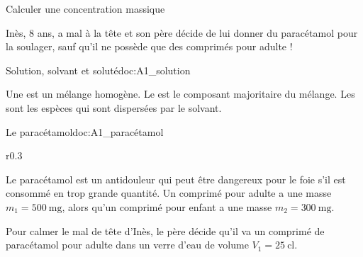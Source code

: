 \teteSndSolu

\vspace*{-36pt}

\begin{objectifs}
  \item Calculer une concentration massique
\end{objectifs}


\begin{contexte}
  Inès, 8 ans, a mal à la tête et son père décide de lui donner du paracétamol pour la soulager, sauf qu'il ne possède que des comprimés pour adulte !

\end{contexte}


\begin{doc}{Solution, solvant et soluté}{doc:A1_solution}
  \begin{importants}
    Une  est un mélange homogène.
    Le  est le composant majoritaire du mélange.
    Les  sont les espèces qui sont dispersées par le solvant.
    \begin{center}
    \end{center}
  \end{importants}
\end{doc}

\begin{doc}{Le paracétamol}{doc:A1_paracétamol}
  \begin{wrapfigure}[5]{r}{0.3\linewidth}
    \vspace*{-30pt}
    \centering
  \end{wrapfigure}
  
  Le paracétamol est un antidouleur qui peut être dangereux pour le foie s'il est consommé en trop grande quantité.
  Un comprimé pour adulte a une masse $m_1 = \qty{500}{\milli\g}$, alors qu'un comprimé pour enfant a une masse $m_2 = \qty{300}{\milli\g}$.
  
  Pour calmer le mal de tête d'Inès, le père décide qu'il va  un comprimé de paracétamol pour adulte dans un verre d'eau de volume $V_1 = \qty{25}{\centi\litre}$.
\end{doc}


